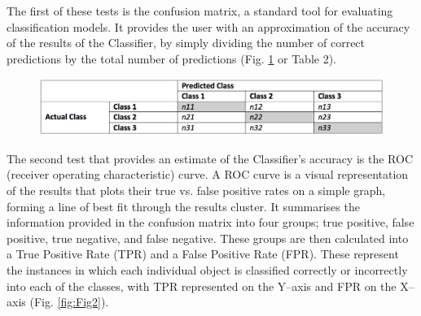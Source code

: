 	The first of these tests is the confusion matrix, a standard tool for evaluating classification models. It provides the user with an approximation of the accuracy of the results of the Classifier, by simply dividing the number of correct predictions by the total number of predictions \parencite[149]{Tan_2006}(Fig. \ref{fig:Table2} or Table 2).
	
		\begin{figure}[!htb]
			\includegraphics[width=\linewidth]{figures/thoeming_Table2}
			\centering
			\label{fig:Table2}
		\end{figure}	
	The second test that provides an estimate of the Classifier’s accuracy is the ROC (receiver operating characteristic) curve. A ROC curve is a visual representation of the results that plots their true vs. false positive rates on a simple graph, forming a line of best fit through the results cluster. It summarises the information provided in the confusion matrix into four groups; true positive, false positive, true negative, and false negative. These groups are then calculated into a True Positive Rate (TPR) and a False Positive Rate (FPR). These represent the instances in which each individual object is classified correctly or incorrectly into each of the classes, with TPR represented on the Y–axis and FPR on the X–axis \parencite[298--301]{Tan_2006}(Fig. \ref{fig:Fig2}).
	
